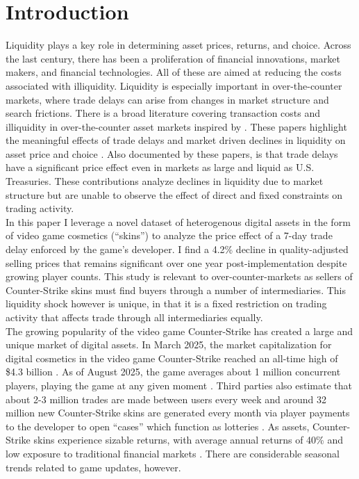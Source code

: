 \documentclass[12pt,letterpaper]{article}
\begin{document}
\newpage 
	 
\section{Introduction}
Liquidity plays a key role in determining asset prices, returns, and choice. Across the last century, there has been a proliferation of financial innovations, market makers, and financial technologies. All of these are aimed at reducing the costs associated with illiquidity. Liquidity is especially important in over-the-counter markets, where trade delays can arise from changes in market structure and search frictions. There is a broad literature covering transaction costs and illiquidity in over-the-counter asset markets inspired by \textcite{dgp_2005}. These papers highlight the meaningful effects of trade delays and market driven declines in liquidity on asset price and choice \parencites{dgp_2007}{krishna_2002}{lagos_rocheteau_2007}{amihud_et_al_2006}{geromichalos_et_al_2016}. Also documented by these papers, is that trade delays have a significant price effect even in markets as large and liquid as U.S. Treasuries. These contributions analyze declines in liquidity due to market structure but are unable to observe the effect of direct and fixed constraints on trading activity.\\

In this paper I leverage a novel dataset of heterogenous digital assets in the form of video game cosmetics (``skins'') to analyze the price effect of a 7-day trade delay enforced by the game's developer. I find a 4.2\% decline in quality-adjusted selling prices that remains significant over one year post-implementation despite growing player counts. This study is relevant to over-counter-markets as sellers of Counter-Strike skins must find buyers through a number of intermediaries. This liquidity shock however is unique, in that it is a fixed restriction on trading activity that affects trade through all intermediaries equally.\\

The growing popularity of the video game Counter-Strike has created a large and unique market of digital assets. In March 2025, the market capitalization for digital cosmetics in the video game Counter-Strike reached an all-time high of \$4.3 billion \autocite{bloomberg2025-03-07}. As of August 2025, the game averages about 1 million concurrent players, playing the game at any given moment \parencite{steamcharts_cs}. Third parties also estimate that about 2-3 million trades are made between users every week \parencite{tradeTF} and around 32 million new Counter-Strike skins are generated every month via player payments to the developer to open ``cases'' which function as lotteries \parencite{case-tracker}. As assets, Counter-Strike skins experience sizable returns, with average annual returns of 40\% and low exposure to traditional financial markets \parencite{dobrynskaya_2025}. There are considerable seasonal trends related to game updates, however.\\
\end{document}
